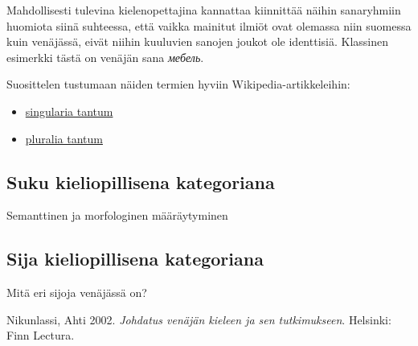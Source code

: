 \documentclass[]{scrartcl}
\begin{document}
Mahdollisesti tulevina kielenopettajina kannattaa kiinnittää näihin
sanaryhmiin huomiota siinä suhteessa, että vaikka mainitut ilmiöt ovat
olemassa niin suomessa kuin venäjässä, eivät niihin kuuluvien sanojen
joukot ole identtisiä. Klassinen esimerkki tästä on venäjän sana
\emph{мебель}.

Suosittelen tustumaan näiden termien hyviin Wikipedia-artikkeleihin:

\begin{itemize}
\itemsep1pt\parskip0pt
\item
  \href{https://ru.wikipedia.org/wiki/Singularia_tantum}{singularia
  tantum}
\item
  \href{https://ru.wikipedia.org/wiki/Pluralia_tantum}{pluralia tantum}
\end{itemize}

\subsection{Suku kieliopillisena
kategoriana}\label{suku-kieliopillisena-kategoriana}

Semanttinen ja morfologinen määräytyminen

\subsection{Sija kieliopillisena
kategoriana}\label{sija-kieliopillisena-kategoriana}

Mitä eri sijoja venäjässä on?

Nikunlassi, Ahti 2002. \emph{Johdatus venäjän kieleen ja sen
tutkimukseen}. Helsinki: Finn Lectura.
\end{document}
